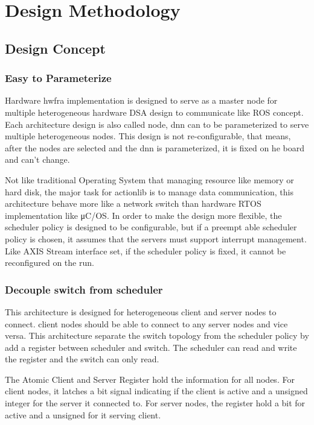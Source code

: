 \chapter{Design Methodology}
\label{sec:design_methodology}

\section{Design Concept}

\subsection{Easy to Parameterize}

Hardware \gls{hwfra} implementation is designed to serve as a master node for multiple heterogeneous hardware DSA design to communicate like ROS concept. Each architecture design is also called node, \gls{dnn}  can to be parameterized to serve multiple heterogeneous nodes. This design is not re-configurable, that means, after the nodes are selected and the \gls{dnn}  is parameterized, it is fixed on he board and can’t change.
 
Not like traditional Operating System that managing resource like memory or hard disk, the major task for actionlib is to manage data communication, this architecture behave more like a network switch than hardware RTOS implementation like μC/OS. In order to make the design more flexible, the scheduler policy is designed to be configurable, but if a preempt able scheduler policy is chosen, it assumes that the servers must support interrupt management. Like AXIS Stream interface set, if the scheduler policy is fixed, it cannot be reconfigured on the run.


\subsection{Decouple switch from scheduler}
This architecture is designed for heterogeneous client and server nodes to connect. client nodes should be able to connect to any server nodes and vice versa. This architecture separate the switch topology from the scheduler policy by add a register between scheduler and switch. The scheduler can read and write the register and the switch can only read. 

The Atomic Client and Server Register hold the information for all nodes. For client nodes, it latches a bit signal indicating if the client is active and a unsigned integer for the server it connected to. For server nodes, the register hold a bit for active and a unsigned for it serving client.

